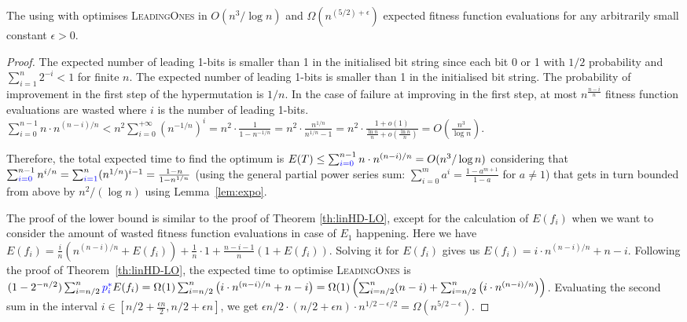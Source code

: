 \documentclass[lettersize,journal]{IEEEtran}
\begin{document}
\begin{theorem} \label{expohdOnLO}
The {\oneoneIA } using \IPHfcm{} with {\expoF } optimises \textsc{LeadingOnes} in $O(n^3/\log n)$ and 
$\Omega(n^{(5/2)+\epsilon})$  expected fitness function evaluations for any 
arbitrarily small constant $\epsilon>0$. 
\end{theorem}

\begin{proof}
{\color{blue} The expected number of leading 1-bits is smaller than 1 in the initialised bit 
	string since each bit 0 or 1 with $1/2$ probability and $\sum^{n}_{i=1}2^{-i}<1$ for finite $n$.} The expected number of leading 1-bits is smaller than 1 in the initialised bit 
string. The probability of improvement in the first step {\color{blue} of the hypermutation} is $1/n$. In the case of 
failure at improving in the first step, at most $n^{\frac{n-i}{n}}$ fitness 
function evaluations are wasted where $i$ is the number of leading 
1-bits. {\color{blue}$\sum_{i = 0}^{n - 1} n \cdot n^{(n - i) / n} < n^2 \sum_{i = 0}^{+\infty}(n^{-1/n})^i = n^2 \cdot \frac{1}{1 - n^{-1/n}} = n^2 \cdot \frac{n^{1/n}}{n^{1/n} - 1} = n^2 \cdot \frac{1 + o(1)}{\frac{\ln{n}}{n} + o(\frac{\ln{n}}{n})} = O(\frac{n^3}{\log{n}})$. }

Therefore, the total expected time to find the optimum is  $E(T) \leq 
\sum_{{\color{blue}i=0}}^{n-1} n \cdot n^{(n-i)/n}=O( n^3/\log n)$ considering that $ 
\sum_{{\color{blue}i=0}}^{n-1} n^{i/n}= \sum_{{\color{blue}i=1}}^n (n^{1/n})^{i-1}=\frac{1-n}{1-n^{1/n}}$ (using the general partial power series sum: $\sum_{i=0}^{m}a^{i}=\frac{1-a^{m+1}}{1-a}$ for $a\neq 1$)  that gets in turn bounded from above by $n^2/(\log n)$ using Lemma~\ref{lem:expo}.


The proof of the lower bound is similar to the proof of Theorem \ref{th:linHD-LO}, except for the calculation of $E(f_i)$ when we want to consider the amount of wasted fitness function evaluations in case of $E_1$ happening. Here we have $ E(f_i) = \frac{i}{n} \left( n^{(n-i)/n}+ E(f_i)\right) + \frac{1}{n} \cdot 1 +\frac{n-i-1}{n} \left( 1+ E(f_i)\right)$. Solving it for $E(f_i)$ gives us $E(f_i)=i\cdot n^{(n-i)/n}+n-i$. 
{\color{blue}Following the proof of Theorem~\ref{th:linHD-LO}}, the expected time to optimise \textsc{LeadingOnes} is 
$(1-2^{-n/2})\sum_{i=n/2}^{n} {\color{blue}p_{i}^{*}} E(f_i)=\Omega(1) \sum_{i=n/2}^{n} 
\left(i\cdot n^{(n-i)/n}+n-i \right)=\Omega(1)\left( \sum_{i=n/2}^{n} (n-i)+ 
\sum_{i=n/2}^{n} \left(i\cdot n^{(n-i)/n}\right)\right)$. Evaluating the second 
sum in the interval $i\in [n/2+\frac{\epsilon n}{2}, n/2+\epsilon n]$, we get $\epsilon 
n/2 \cdot (n/2 + \epsilon n)  \cdot 
n^{1/2-\epsilon/2}=\Omega(n^{5/2-\epsilon})$.
\end{proof}
\end{document}
